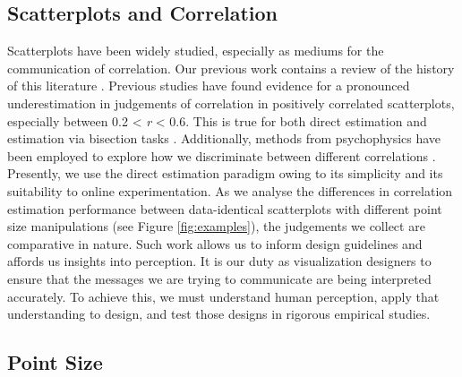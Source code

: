 \documentclass{vgtc}                          %
\begin{document}
\hypertarget{scatterplots-and-correlation}{%
\subsection{Scatterplots and Correlation}\label{scatterplots-and-correlation}}

Scatterplots have been widely studied, especially as mediums for the communication
of correlation. Our previous work contains a review of the history of
this literature \cite{strain_2023}. Previous studies have found evidence for a
pronounced underestimation in judgements of correlation in positively correlated
scatterplots, especially between 0.2 \textless{} \emph{r} \textless{} 0.6. This
is true for both direct estimation \cite{meyer_1992, collyer_1990} and estimation
via bisection tasks \cite{rensink_2017}. Additionally, methods from psychophysics
have been employed to explore how we discriminate between different correlations
\cite{rensink_2014, rensink_2017}. Presently, we use the direct estimation paradigm
owing to its simplicity and its suitability to online experimentation.
As we analyse the differences in correlation estimation performance
between data-identical scatterplots with different point size manipulations (see Figure \ref{fig:examples}),
the judgements we collect are comparative in nature.
Such work allows us to inform design guidelines and affords us insights into perception.
It is our duty as visualization designers to ensure that the
messages we are trying to communicate are being interpreted accurately.
To achieve this, we must understand human perception, apply that understanding
to design, and test those designs in rigorous empirical studies.

\hypertarget{point-size}{%
\subsection{Point Size}\label{point-size}}
\end{document}
